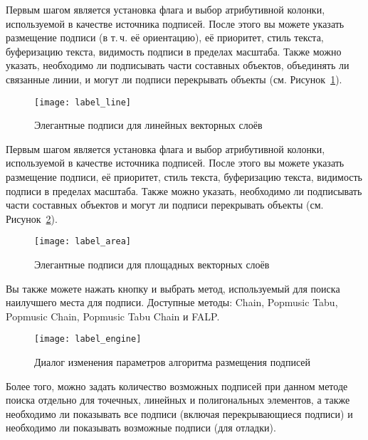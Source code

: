 
Первым шагом является установка флага 
и выбор атрибутивной колонки, используемой в качестве источника подписей.
После этого вы можете указать размещение подписи (в т.\,ч. её ориентацию),
её приоритет, стиль текста, буферизацию текста, видимость подписи в пределах
масштаба. Также можно указать, необходимо ли подписывать части составных
объектов, объединять ли связанные линии, и могут ли подписи перекрывать объекты
(см. Рисунок~\ref{fig:linelabel}).

\begin{figure}[ht]
\centering
   \texttt{[image: label\_line]}
   \caption{Элегантные подписи для линейных векторных слоёв \wincaption}\label{fig:linelabel}
\end{figure}


Первым шагом является установка флага 
и выбор атрибутивной колонки, используемой в качестве источника подписей.
После этого вы можете указать размещение подписи, её приоритет, стиль
текста, буферизацию текста, видимость подписи в пределах масштаба. Также
можно указать, необходимо ли подписывать части составных объектов и могут
ли подписи перекрывать объекты (см. Рисунок~\ref{fig:arealabel}).

\begin{figure}[ht]
\centering
   \texttt{[image: label\_area]}
   \caption{Элегантные подписи для площадных векторных слоёв \wincaption}\label{fig:arealabel}
\end{figure}


Вы также можете нажать кнопку  и выбрать метод,
используемый для поиска наилучшего места для подписи. Доступные методы:
Chain, Popmusic Tabu, Popmusic Chain, Popmusic Tabu Chain и FALP.

\begin{figure}[ht]
\centering
   \texttt{[image: label\_engine]}
   \caption{Диалог изменения параметров алгоритма размещения подписей \wincaption}\label{fig:labelengine}
\end{figure}

Более того, можно задать количество возможных подписей при данном методе
поиска отдельно для точечных, линейных и полигональных элементов, а также
необходимо ли показывать все подписи (включая перекрывающиеся подписи) и
необходимо ли показывать возможные подписи (для отладки).

